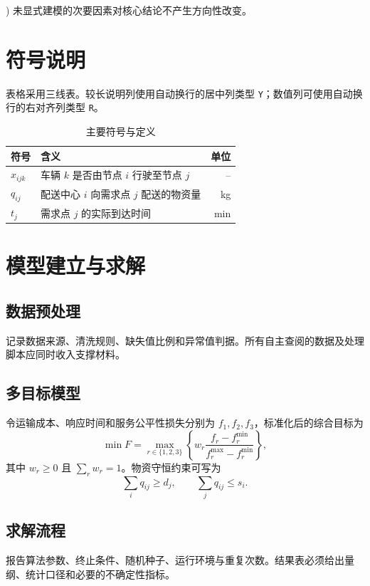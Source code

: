 \documentclass[zihao=-4,a4paper,UTF8,fontset=none]{ctexart}
\begin{document}
) 未显式建模的次要因素对核心结论不产生方向性改变。

\section{符号说明}
表格采用三线表。较长说明列使用自动换行的居中列类型 \texttt{Y}；数值列可使用自动换行的右对齐列类型 \texttt{R}。

\begin{table}[H]
  \centering
  \caption{主要符号与定义}
  \label{tab:symbols}
  \begin{tabularx}{0.86\textwidth}{C{0.18\textwidth}Y R}
    \toprule
    符号 & 含义 & 单位 \\
    \midrule
    $x_{ijk}$ & 车辆 $k$ 是否由节点 $i$ 行驶至节点 $j$ & -- \\
    $q_{ij}$  & 配送中心 $i$ 向需求点 $j$ 配送的物资量 & \si{\kilogram} \\
    $t_j$     & 需求点 $j$ 的实际到达时间 & \si{\minute} \\
    \bottomrule
  \end{tabularx}
\end{table}

\section{模型建立与求解}
\subsection{数据预处理}
记录数据来源、清洗规则、缺失值比例和异常值判据。所有自主查阅的数据及处理脚本应同时收入支撑材料。

\subsection{多目标模型}
令运输成本、响应时间和服务公平性损失分别为 $f_1,f_2,f_3$，标准化后的综合目标为
\begin{equation}
  \min F=\max_{r\in\{1,2,3\}}\left\{w_r\frac{f_r-f_r^{\min}}{f_r^{\max}-f_r^{\min}}\right\},
  \label{eq:objective}
\end{equation}
其中 $w_r\ge 0$ 且 $\sum_r w_r=1$。物资守恒约束可写为
\begin{equation}
  \sum_i q_{ij}\ge d_j,\qquad
  \sum_j q_{ij}\le s_i.
\end{equation}

\subsection{求解流程}
报告算法参数、终止条件、随机种子、运行环境与重复次数。结果表必须给出量纲、统计口径和必要的不确定性指标。
\end{document}
